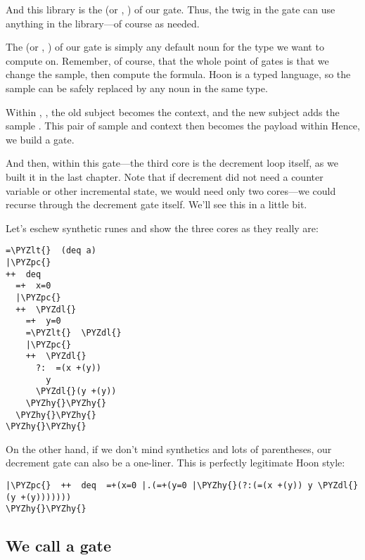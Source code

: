 And this library is the  (or \kode{+\textgreater{}}, ) of our gate.
Thus, the twig in the gate can use anything in the library---of
course as needed.

The  (or \kode{+\textless{}}, ) of our gate is simply any default
noun for the type we want to compute on.  Remember, of course,
that the whole point of gates is that we change the sample, then
compute the formula.  Hoon is a typed language, so the sample can
be safely replaced by any noun in the same type.

Within \kode{=+}, , the old subject becomes the context, and
the new subject adds the sample .  This pair of sample
and context then becomes the payload within   Hence, we build
a gate.

And then, within this gate---the third core is the decrement loop
itself, as we built it in the last chapter.  Note that if
decrement did not need a counter variable or other incremental
state, we would need only two cores---we could recurse through
the decrement gate itself.  We'll see this in a little bit.

Let's eschew synthetic runes and show the three cores as they
really are:
\begin{framed_shaded}
\begin{Verbatim}[fontsize=\relsize{-2.5},fontseries=b,commandchars=\\\{\}]
=\PYZlt{}  (deq a)
|\PYZpc{}
++  deq
  =+  x=0
  |\PYZpc{}  
  ++  \PYZdl{}
    =+  y=0
    =\PYZlt{}  \PYZdl{}
    |\PYZpc{}  
    ++  \PYZdl{}
      ?:  =(x +(y))
        y
      \PYZdl{}(y +(y))
    \PYZhy{}\PYZhy{}
  \PYZhy{}\PYZhy{}
\PYZhy{}\PYZhy{}
\end{Verbatim}
\end{framed_shaded}

On the other hand, if we don't mind synthetics and lots of
parentheses, our decrement gate can also be a one-liner.  This is
perfectly legitimate Hoon style:
\begin{framed_shaded}
\begin{Verbatim}[fontsize=\relsize{-2.5},fontseries=b,commandchars=\\\{\}]
|\PYZpc{}  ++  deq  =+(x=0 |.(=+(y=0 |\PYZhy{}(?:(=(x +(y)) y \PYZdl{}(y +(y)))))))
\PYZhy{}\PYZhy{}
\end{Verbatim}
\end{framed_shaded}

\subsection{We call a gate}


